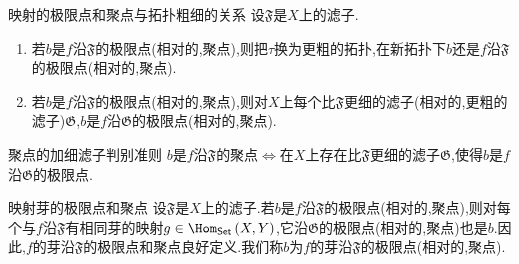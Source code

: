 \begin{remark}{映射的极限点和聚点与拓扑粗细的关系}{}
	设$\mathfrak{F}$是$X$上的滤子.
	\begin{enumerate}
		\item 若$b$是$f$沿$\mathfrak{F}$的极限点(相对的,聚点),则把$\tau$换为更粗的拓扑,在新拓扑下$b$还是$f$沿$\mathfrak{F}$的极限点(相对的,聚点).
		\item 若$b$是$f$沿$\mathfrak{F}$的极限点(相对的,聚点),则对$X$上每个比$\mathfrak{F}$更细的滤子(相对的,更粗的滤子)$\mathfrak{G}$,$b$是$f$沿$\mathfrak{G}$的极限点(相对的,聚点).
	\end{enumerate}
\end{remark}

\begin{proposition}{聚点的加细滤子判别准则}{}
	$b$是$f$沿$\mathfrak{F}$的聚点$\iff$在$X$上存在比$\mathfrak{F}$更细的滤子$\mathfrak{G}$,使得$b$是$f$沿$\mathfrak{G}$的极限点.
\end{proposition}

\begin{remark}{映射芽的极限点和聚点}{}
	设$\mathfrak{F}$是$X$上的滤子.若$b$是$f$沿$\mathfrak{F}$的极限点(相对的,聚点),则对每个与$f$沿$\mathfrak{F}$有相同芽的映射$g\in\Hom_{\mathsf{Set}}\left(X,Y\right)$,它沿$\mathfrak{G}$的极限点(相对的,聚点)也是$b$.因此,$f$的芽沿$\mathfrak{F}$的极限点和聚点良好定义.我们称$b$为$f$的芽沿$\mathfrak{F}$的极限点(相对的,聚点).
\end{remark}






